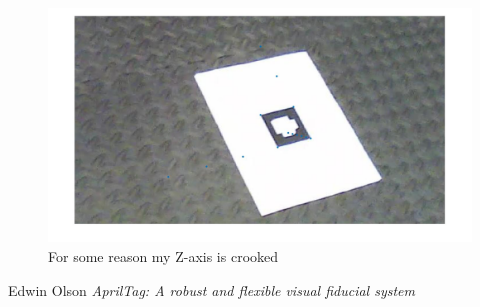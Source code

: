 \documentclass[12pt]{article}
\begin{document}
\begin{figure}
    \center
    \includegraphics[width=\linewidth]{img/Projection}
    \caption{For some reason my Z-axis is crooked}
    \label{fig_proj}
\end{figure}

\begin{thebibliography}{9}

  Edwin Olson
  \emph{AprilTag: A robust and flexible visual fiducial system}

\end{thebibliography}
\end{document}
